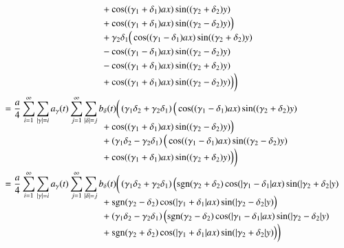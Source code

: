 \begin{align*}
\\[-1ex]
&\phantom{=abbb\sum\sum.....{}ccccccc}
+\cos((\gamma_1 + \delta_1)ax)\sin((\gamma_2 + \delta_2)y)
\\[-1ex]
&\phantom{=abbb\sum\sum.....{}ccccccc}
+\cos((\gamma_1 + \delta_1)ax)\sin((\gamma_2 - \delta_2)y)
\Big)
\\[-1ex]
&\phantom{=abbb\sum\sum.....{}ccccccc}
+
\gamma_2 \delta_1
\Big(
\cos((\gamma_1 - \delta_1)ax)\sin((\gamma_2 + \delta_2)y)
\\[-1ex]
&\phantom{=abbb\sum\sum.....{}ccccccc}
-\cos((\gamma_1 - \delta_1)ax)\sin((\gamma_2 - \delta_2)y)
\\[-1ex]
&\phantom{=abbb\sum\sum.....{}ccccccc}
-\cos((\gamma_1 + \delta_1)ax)\sin((\gamma_2 + \delta_2)y)
\\[-1ex]
&\phantom{=abbb\sum\sum.....{}ccccccc}
+\cos((\gamma_1 + \delta_1)ax)\sin((\gamma_2 - \delta_2)y)
\Big)
\bigg)
\\
&=
\frac{a}{4}
\sum_{i = 1}^{\infty}
\sum_{|\gamma| = i}
a_{\gamma}(t)
\sum_{j = 1}^{\infty}
\sum_{|\delta| = j}
b_{\delta}(t)
\bigg(
\left(\gamma_1 \delta_2 + \gamma_2 \delta_1 \right)
\Big(
\cos((\gamma_1 - \delta_1)ax)\sin((\gamma_2 + \delta_2)y)
\\[-2ex]
&\phantom{=abbb\sum\sum.....{}ccccccc}
+
\cos((\gamma_1 + \delta_1)ax)\sin((\gamma_2 - \delta_2)y)
\Big)
\\[-1ex]
&\phantom{=abbb\sum\sum.....{}ccccccc}
+
\left(\gamma_1 \delta_2 - \gamma_2 \delta_1 \right)
\Big(
\cos((\gamma_1 - \delta_1)ax)\sin((\gamma_2 - \delta_2)y)
\\[-1ex]
&\phantom{=abbb\sum\sum.....{}ccccccc}
+
\cos((\gamma_1 + \delta_1)ax)\sin((\gamma_2 + \delta_2)y)
\Big)
\bigg)
\\
&=
\frac{a}{4}
\sum_{i = 1}^{\infty}
\sum_{|\gamma| = i}
a_{\gamma}(t)
\sum_{j = 1}^{\infty}
\sum_{|\delta| = j}
b_{\delta}(t)
\bigg(
\left(\gamma_1 \delta_2 + \gamma_2 \delta_1 \right)
\Big(
\sgn(\gamma_2 + \delta_2)
\cos(|\gamma_1 - \delta_1|ax)\sin(|\gamma_2 + \delta_2|y)
\\[-2ex]
&\phantom{=abbb\sum\sum.....{}ccccccc}
+
\sgn(\gamma_2 - \delta_2)
\cos(|\gamma_1 + \delta_1|ax)\sin(|\gamma_2 - \delta_2|y)
\Big)
\\[-1ex]
&\phantom{=abbb\sum\sum.....{}ccccccc}
+
\left(\gamma_1 \delta_2 - \gamma_2 \delta_1 \right)
\Big(
\sgn(\gamma_2 - \delta_2)
\cos(|\gamma_1 - \delta_1|ax)\sin(|\gamma_2 - \delta_2|y)
\\[-1ex]
&\phantom{=abbb\sum\sum.....{}ccccccc}
+
\sgn(\gamma_2 + \delta_2)
\cos(|\gamma_1 + \delta_1|ax)\sin(|\gamma_2 + \delta_2|y)
\Big)
\bigg)
\end{align*}
